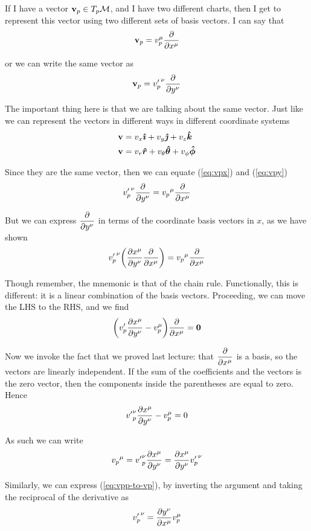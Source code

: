 		If I have a vector $\vb{v}_p \in T_p \mathcal{M}$, and I have two different charts, then I get
		to represent this vector using two different sets of basis vectors. I can say that
		\begin{equation}
			\vb{v}_p = v_p^\mu \pdv{}{x^\mu}
			\label{eq:vpx}
		\end{equation}

		or we can write the same vector as
		\begin{equation}
			\vb{v}_p = {v'_p}^\nu \pdv{}{y^\nu}
			\label{eq:vpy}
		\end{equation}

		The important thing here is that we are talking about the same vector. Just like we can represent the vectors
		in different ways in different coordinate systems
		\begin{align*}
			\vb{v} &= v_x \vu*{\imath} + v_y \vu*{\jmath} + v_z \vu*{k}\\
			\vb{v} &= v_r \vu*{r} + v_\theta \vu*{\theta} + v_\phi \vu*{\phi}
		\end{align*}

		Since they are the same vector, then we can equate (\ref{eq:vpx}) and (\ref{eq:vpy})
		\[
			{v'_p}^\nu \pdv{}{y^\nu}
			=	
			{v_p}^\mu \pdv{}{x^\mu}
		\]

		But we can express $\displaystyle\pdv{}{y^\nu}$ in terms of the coordinate basis vectors in $x$, as we have shown
		\[
			{v'_p}^\nu
			\pqty{
				\pdv{x^\mu}{y^\nu}
				\pdv{}{x^\mu} 
			}
			=	
			{v_p}^\mu \pdv{}{x^\mu}
		\]

		Though remember, the mnemonic is that of the chain rule. Functionally, this is different: it is a linear combination of the basis vectors.
		Proceeding, we can move the LHS to the RHS, and we find
		\[
			\pqty{
				v'_p \pdv{x^\mu}{y^\nu} - v_p^\mu
			}
			\pdv{}{x^\mu}
			=
			\vb{0}
		\]

		Now we invoke the fact that we proved last lecture: that $\displaystyle\pdv{}{x^\mu}$ is
		a basis, so the vectors are linearly independent. If the sum of the
		coefficients and the vectors is the zero vector, then the components inside the
		parentheses are equal to zero. Hence
		\[
			{v'}_p^\nu \pdv{x^\mu}{y^\nu} - v_p^\mu
			=
			0
		\]

		As such we can write
		\begin{equation}
			{v_p}^\mu = 
			{v'}_p^\nu \pdv{x^\mu}{y^\nu}  
			= 
			{\pdv{x^\mu}{y^\nu}} {v'_p}^\nu
			\label{eq:vpp-to-vp} 
		\end{equation}

		Similarly, we can express (\ref{eq:vpp-to-vp}), by inverting the
		argument and taking the reciprocal of the derivative as
		\begin{equation}
			{v'_p}^\nu = 
			\pdv{y^\nu}{x^\mu} v_p^\mu 
			\label{eq:vp-to-vpp}
		\end{equation}

